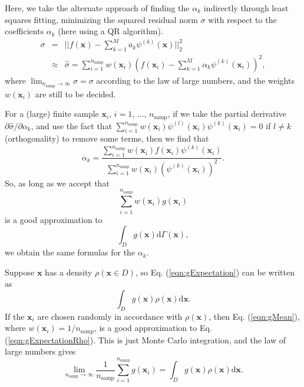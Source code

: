 \documentclass[numbers]{frontiersSCNS}
\renewcommand{\vec}[1]{\bm{#1}}
\newcommand{\diff}{\mathrm{d}}  %
\newcommand{\numCofs}{{M}}
\newcommand{\basisFuncSymbol}{\psi}
\newcommand{\basisFunc}[1]{\basisFuncSymbol^{(#1)}}
\newcommand{\xMeasure}{\Gamma}
\newcommand{\diffMeasureVec}{{\diff \xMeasure(\vec x)}}
\newcommand{\intD}{{\int_D}}
\newcommand{\numSamps}{{n_\text{samp}}}
\newcommand{\eqnRef}[1]{Eq. (\ref{eqn:#1})}
\newcommand{\scalarFuncIndex}{k}
\newcommand{\scalarFuncIndexAlt}{l}
\begin{document}
Here, we take the alternate approach of finding the $\alpha_{\scalarFuncIndex}$
indirectly through least squares fitting,
minimizing the squared residual norm $\sigma$
with respect to the coefficients $\alpha_{\scalarFuncIndex}$
(here using a QR algorithm).
\begin{equation}
\label{eqn:errMinimizedByProjection}
\begin{array}{rcl}
\sigma &=& || f(\vec x) - \sum_{{\scalarFuncIndex}=1}^{\numCofs}
                    a_{\scalarFuncIndex} \basisFunc{\scalarFuncIndex}(\vec x)
                    ||_2^2 \\
&\approx& \hat \sigma = \sum_{i=1}^\numSamps w(\vec x_i)
\left(
f(\vec x_i) - \sum_{{\scalarFuncIndex}=1}^{\numCofs}
                    \alpha_{\scalarFuncIndex} \basisFunc{\scalarFuncIndex}(\vec x_i)
                    \right) ^ 2,
\end{array}
\end{equation}
%
where $\lim_{\numSamps\rightarrow\infty} \hat \sigma = \sigma$
according to the law of large numbers,
and the weights $w(\vec x_i)$ are still to be decided.


For a (large) finite sample $\vec x_i$, $i=1,\,\ldots,\,\numSamps$,
if we take the partial derivative $\partial \hat \sigma / \partial \alpha_{\scalarFuncIndex}$,
and use the fact that
$
    \sum_{i=1}^\numSamps w(\vec x_i)\basisFunc{\scalarFuncIndexAlt}(\vec x_i) \basisFunc{\scalarFuncIndex}(\vec x_i) = 0
$
if ${\scalarFuncIndexAlt} \neq {\scalarFuncIndex}$ (orthogonality) to remove some terms, then we find that
\begin{equation}
    \alpha_{\scalarFuncIndex} = \frac{
        \sum_{i=1}^\numSamps w(\vec x_i) f(\vec x_i) \basisFunc{\scalarFuncIndex}(\vec x_i)
    }{
        \sum_{i=1}^\numSamps w(\vec x_i) ( \basisFunc{\scalarFuncIndex}(\vec x_i) )^2
    }.
\end{equation}
%
So, as long as we accept that
\begin{equation}
    \label{eqn:gMean}
    \sum_{i=1}^\numSamps w(\vec x_i) g(\vec x_i)
\end{equation}
is a good approximation to
\begin{equation}
    \label{eqn:gExpectation}
    \intD{} g(\vec x) \diffMeasureVec,
\end{equation}
we obtain the same formulas for the $\alpha_{\scalarFuncIndex}$.

Suppose $\vec x$ has a density $\rho(\vec x\in D)$, so \eqnRef{gExpectation} can be written as
\begin{equation}
    \label{eqn:gExpectationRho}
    \intD{} g(\vec x) \rho(\vec x) \diff \vec x.
\end{equation}
%
If the $\vec x_i$ are chosen randomly in accordance with $\rho(\vec x)$,
then \eqnRef{gMean}, where $w(\vec x_i)=1/\numSamps$,
is a good approximation to \eqnRef{gExpectationRho}.
%
This is just Monte Carlo integration, and the law of large numbers gives
\begin{equation}
    \label{eqn:lawOfLargeNumbers}
    \lim_{\numSamps\rightarrow\infty}
    \frac{1}{\numSamps}
    \sum_{i=1}^\numSamps g(\vec x_i)
    =
    \intD{} g(\vec x) \rho(\vec x) \diff \vec x.
\end{equation}
\end{document}
